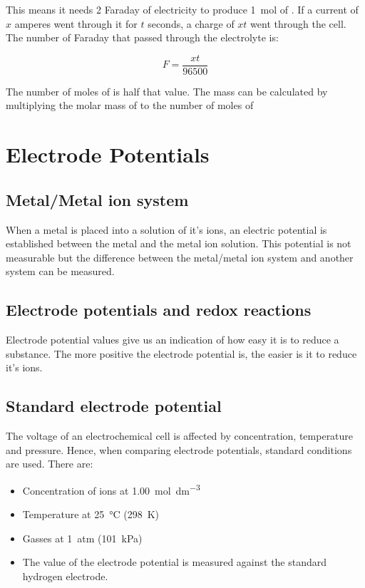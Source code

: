 \documentclass{scrbook}
\begin{document}
	This means it needs 2 Faraday of electricity to produce \SI{1}{\mole} of . If a current of $x$ amperes went through it for $t$ seconds, a charge of $xt$ went through the cell. The number of Faraday that passed through the electrolyte is:

	\[ F = \frac{xt}{96500} \]

	The number of moles of  is half that value. The mass can be calculated by multiplying the molar mass of  to the number of moles of 

\section{Electrode Potentials}

\subsection{Metal/Metal ion system}

	When a metal is placed into a solution of it's ions, an electric potential is established between the metal and the metal ion solution. This potential is not measurable but the difference between the metal/metal ion system and another system can be measured.

\subsection{Electrode potentials and redox reactions}

	Electrode potential values give us an indication of how easy it is to reduce a substance. The more positive the electrode potential is, the easier is it to reduce it's ions.

\subsection{Standard electrode potential}

	The voltage of an electrochemical cell is affected by concentration, temperature and pressure. Hence, when comparing electrode potentials, standard conditions are used. There are:

	\begin{itemize}
		\item
			Concentration of ions at \SI{1.00}{\mole\per\deci\metre\cubed}
		\item
			Temperature at \SI{25}{\celsius} (\SI{298}{\kelvin})
		\item
			Gasses at \SI{1}{atm} (\SI{101}{\kilo\pascal})
		\item
			The value of the electrode potential is measured against the standard hydrogen electrode.
	\end{itemize}
\end{document}
